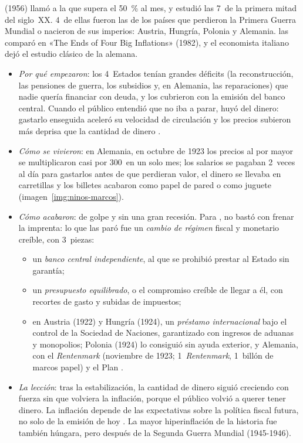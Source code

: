 \documentclass[11pt]{article}
\begin{document}
\begin{anotaciones}
 (1956) llamó  a la que supera el 50~\% al mes, y estudió las 7~de la primera mitad del siglo~XX\nocite{Cagan1956Monetary}. 4~de ellas fueron las de los países que perdieron la Primera Guerra Mundial o nacieron de sus imperios: Austria, Hungría, Polonia y Alemania.  las comparó en «The Ends of Four Big Inflations» (1982), y el economista italiano  dejó el estudio clásico de la alemana\nocite{Sargent1982Ends,BrescianiTurroni1937Economics}.
\begin{itemize}
\item \emph{Por qué empezaron}: los 4~Estados tenían grandes déficits (la reconstrucción, las pensiones de guerra, los subsidios y, en Alemania, las reparaciones) que nadie quería financiar con deuda, y los cubrieron con la emisión del banco central. Cuando el público entendió que no iba a parar, huyó del dinero: gastarlo enseguida aceleró su velocidad de circulación y los precios subieron más deprisa que la cantidad de dinero .
\item \emph{Cómo se vivieron}: en Alemania, en octubre de 1923 los precios al por mayor se multiplicaron casi por 300~en un solo mes; los salarios se pagaban 2~veces al día para gastarlos antes de que perdieran valor, el dinero se llevaba en carretillas y los billetes acabaron como papel de pared o como juguete (imagen~\ref{img:ninos-marcos}).
\item \emph{Cómo acabaron}: de golpe y sin una gran recesión. Para , no bastó con frenar la imprenta: lo que las paró fue un \emph{cambio de régimen} fiscal y monetario creíble, con 3~piezas:
  \begin{itemize}
  \item un \emph{banco central independiente}, al que se prohibió prestar al Estado sin garantía;
  \item un \emph{presupuesto equilibrado}, o el compromiso creíble de llegar a él, con recortes de gasto y subidas de impuestos;
  \item en Austria (1922) y Hungría (1924), un \emph{préstamo internacional} bajo el control de la Sociedad de Naciones, garantizado con ingresos de aduanas y monopolios; Polonia (1924) lo consiguió sin ayuda exterior, y Alemania, con el \emph{Rentenmark} (noviembre de 1923; 1~\emph{Rentenmark}, 1~billón de marcos papel) y el Plan .
  \end{itemize}
\item \emph{La lección}: tras la estabilización, la cantidad de dinero siguió creciendo con fuerza sin que volviera la inflación, porque el público volvió a querer tener dinero. La inflación depende de las expectativas sobre la política fiscal futura, no solo de la emisión de hoy . La mayor hiperinflación de la historia fue también húngara, pero después de la Segunda Guerra Mundial (1945-1946).

\end{itemize}
\end{anotaciones}
\end{document}
